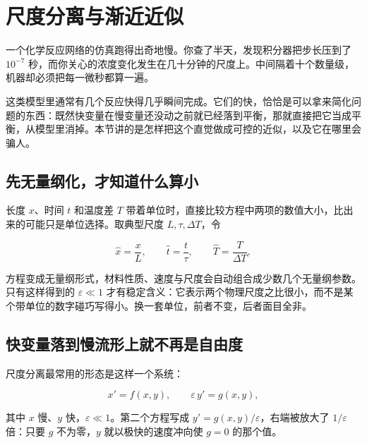 \section{尺度分离与渐近近似}
\label{sec:15-Differential-Equations-and-Dynamical-Systems/01-ODE-Theory/04}

一个化学反应网络的仿真跑得出奇地慢。你查了半天，发现积分器把步长压到了 \(10^{-7}\) 秒，而你关心的浓度变化发生在几十分钟的尺度上。中间隔着十个数量级，机器却必须把每一微秒都算一遍。

这类模型里通常有几个反应快得几乎瞬间完成。它们的快，恰恰是可以拿来简化问题的东西：既然快变量在慢变量还没动之前就已经落到平衡，那就直接把它当成平衡，从模型里消掉。本节讲的是怎样把这个直觉做成可控的近似，以及它在哪里会骗人。

\subsection{先无量纲化，才知道什么算小}

长度 \(x\)、时间 \(t\) 和温度差 \(T\) 带着单位时，直接比较方程中两项的数值大小，比出来的可能只是单位选择。取典型尺度 \(L,\tau,\Delta T\)，令

\[
\widehat x=\frac{x}{L},
\qquad
\widehat t=\frac{t}{\tau},
\qquad
\widehat T=\frac{T}{\Delta T},
\]

方程变成无量纲形式，材料性质、速度与尺度会自动组合成少数几个无量纲参数。只有这样得到的 \(\varepsilon\ll1\) 才有稳定含义：它表示两个物理尺度之比很小，而不是某个带单位的数字碰巧写得小。换一套单位，前者不变，后者面目全非。

\subsection{快变量落到慢流形上就不再是自由度}

尺度分离最常用的形态是这样一个系统：

\[
x'=f(x,y),
\qquad
\varepsilon\,y'=g(x,y),
\]

其中 \(x\) 慢、\(y\) 快，\(\varepsilon\ll1\)。第二个方程写成 \(y'=g(x,y)/\varepsilon\)，右端被放大了 \(1/\varepsilon\) 倍：只要 \(g\) 不为零，\(y\) 就以极快的速度冲向使 \(g=0\) 的那个值。

\begin{center}
\end{center}

